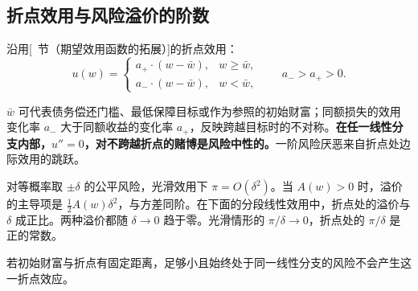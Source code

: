 \subsection{折点效用与风险溢价的阶数}
\begin{tcolorbox}[knowledge,title=参考点处的边际效用跳跃]
沿用[~节（期望效用函数的拓展）]的折点效用：
\[
    u(w)=
    \begin{cases}
        a_+\cdot(w-\bar{w}), & w\ge\bar{w},\\
        a_-\cdot(w-\bar{w}), & w<\bar{w},
    \end{cases}
    \qquad a_{-}>a_{+}>0.
\]

\end{tcolorbox}
$\bar w$ 可代表债务偿还门槛、最低保障目标或作为参照的初始财富；同额损失的效用变化率 $a_-$ 大于同额收益的变化率 $a_+$，反映跨越目标时的不对称。\textbf{在任一线性分支内部，$u''=0$，对不跨越折点的赌博是风险中性的。}一阶风险厌恶来自折点处边际效用的跳跃。

\begin{tcolorbox}[knowledge,title=一阶与二阶风险溢价]
对等概率取 $\pm\delta$ 的公平风险，光滑效用下 $\pi=O(\delta^2)$。当 $A(w)>0$ 时，溢价的主导项是 $\tfrac12 A(w)\delta^2$，与方差同阶。在下面的分段线性效用中，折点处的溢价与 $\delta$ 成正比。两种溢价都随 $\delta\to0$ 趋于零。光滑情形的 $\pi/\delta\to0$，折点处的 $\pi/\delta$ 是正的常数。
\end{tcolorbox}
若初始财富与折点有固定距离，足够小且始终处于同一线性分支的风险不会产生这一折点效应。


